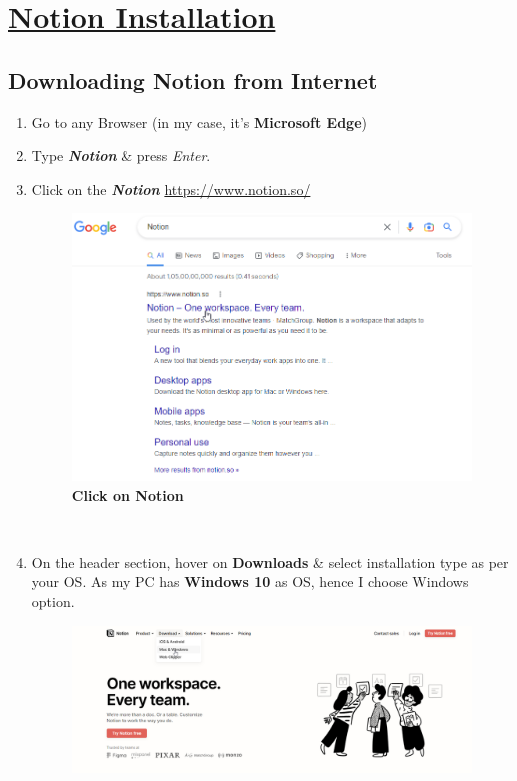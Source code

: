\chapter{\underline{Notion Installation}}
\section{Downloading Notion from Internet}
\begin{enumerate}
    \item Go to any Browser (in my case, it's \textbf{Microsoft Edge})
    \item Type \textit{\textbf{Notion}} \& press \textit{Enter}.
    \item Click on the \textit{\textbf{Notion}} \href{https://www.notion.so/}{https://www.notion.so/}
        \begin{figure}[h]
        \centering
        \includegraphics[scale=0.5]{gfx/1.png}
        \caption{\textbf{Click on Notion}}
        \label{fig_GN}
        \end{figure} \\
    \item On the header section, hover on \textbf{Downloads} \& select installation type as per your OS. As my PC has \textbf{Windows 10} as OS, hence I choose Windows option.
        \begin{figure}[h]
        \centering
        \includegraphics[scale=0.3]{gfx/2.png}

\end{figure}
\end{enumerate}
